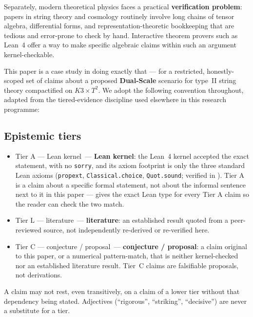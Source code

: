 \documentclass[11pt,a4paper]{article}
\theoremstyle{remark}
\newcommand{\tierA}{\colorbox{green!15}{\textsf{\scriptsize Tier A --- Lean kernel}}}
\newcommand{\tierL}{\colorbox{blue!10}{\textsf{\scriptsize Tier L --- literature}}}
\newcommand{\tierC}{\colorbox{orange!15}{\textsf{\scriptsize Tier C --- conjecture / proposal}}}
\begin{document}
Separately, modern theoretical physics faces a practical \textbf{verification problem}: papers in
string theory and cosmology routinely involve long chains of tensor algebra, differential forms, and
representation-theoretic bookkeeping that are tedious and error-prone to check by hand. Interactive
theorem provers such as Lean~4 \cite{Lean4Paper} offer a way to make specific algebraic claims within
such an argument kernel-checkable.

This paper is a case study in doing exactly that --- for a restricted, honestly-scoped set of claims
about a proposed \textbf{Dual-Scale} scenario for type~II string theory compactified on $K3\times
T^2$. We adopt the following convention throughout, adapted from the tiered-evidence discipline used
elsewhere in this research programme:

\subsection{Epistemic tiers}
\label{sec:tiers}
\begin{itemize}
  \item \tierA\ --- \textbf{Lean kernel}: the Lean~4 kernel accepted the exact statement, with no
    \texttt{sorry}, and its axiom footprint is only the three standard Lean axioms
    (\texttt{propext}, \texttt{Classical.choice}, \texttt{Quot.sound}; verified in
    ). Tier A is a claim about a specific formal statement, not about the informal
    sentence next to it in this paper ---  gives the exact Lean type for every
    Tier A claim so the reader can check the two match.
  \item \tierL\ --- \textbf{literature}: an established result quoted from a peer-reviewed source,
    not independently re-derived or re-verified here.
  \item \tierC\ --- \textbf{conjecture / proposal}: a claim original to this paper, or a numerical
    pattern-match, that is neither kernel-checked nor an established literature result. Tier~C
    claims are falsifiable proposals, not derivations.
\end{itemize}
A claim may not rest, even transitively, on a claim of a lower tier without that dependency being
stated. Adjectives (``rigorous'', ``striking'', ``decisive'') are never a substitute for a tier.
\end{document}
